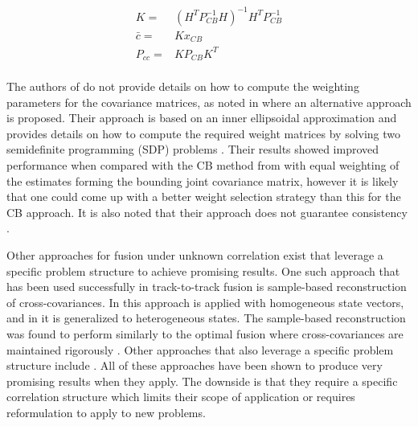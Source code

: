 \documentclass[journal]{IEEEtran}
\begin{document}
\begin{equation}
\begin{aligned}
    K = {}& (H^T P_{CB}^{-1} H)^{-1} H^T P_{CB}^{-1} \\
    \bar{c} = {}& K x_{CB} \\
    P_{cc} = {}& K P_{CB} K^T \\
\end{aligned} \label{eq:cb_wls}
\end{equation}

The authors of \cite{noack2014fusion} do not provide details on how to compute the weighting parameters for the covariance matrices, as noted in \cite{klemets2018hierarchical} where an alternative approach is proposed. Their approach is based on an inner ellipsoidal approximation and provides details on how to compute the required weight matrices by solving two semidefinite programming (SDP) problems \cite{klemets2018hierarchical}.  Their results showed improved performance when compared with the CB method from \cite{noack2014fusion} with equal weighting of the estimates forming the bounding joint covariance matrix, however it is likely that one could come up with a better weight selection strategy than this for the CB approach. It is also noted that their approach does not guarantee consistency \cite{klemets2018hierarchical}.

Other approaches for fusion under unknown correlation exist that leverage a specific problem structure to achieve promising results. One such approach that has been used successfully in track-to-track fusion is sample-based reconstruction of cross-covariances. In \cite{steinbring2016optimal, radtke2018reconstruction} this approach is applied with homogeneous state vectors, and in \cite{radtke2019distributed, radtke2020reconstruction} it is generalized to heterogeneous states. The sample-based reconstruction was found to perform similarly to the optimal fusion where cross-covariances are maintained rigorously \cite{steinbring2016optimal, radtke2018reconstruction, radtke2019distributed, radtke2020reconstruction}. Other approaches that also leverage a specific problem structure include \cite{allig2018heterogeneous, yang2019information, dagan2020heterogeneous, dagan2021exact}. All of these approaches have been shown to produce very promising results when they apply. The downside is that they require a specific correlation structure which limits their scope of application or requires reformulation to apply to new problems.
\end{document}
